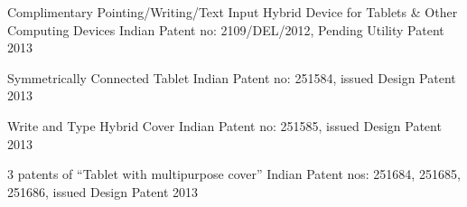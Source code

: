 

\begin{cvhonors}

  \cvhonor
    {Complimentary Pointing/Writing/Text Input Hybrid Device for Tablets \& Other Computing Devices} %
    {Indian Patent no: 2109/DEL/2012, Pending} %
    {Utility Patent} %
    {2013} %


  \cvhonor
    {Symmetrically Connected Tablet} %
    {Indian Patent no: 251584, issued} %
    {Design Patent} %
    {2013} %

  \cvhonor
    {Write and Type Hybrid Cover} %
    {Indian Patent no: 251585, issued} %
    {Design Patent} %
    {2013} %

    
  \cvhonor
    {3 patents of ``Tablet with multipurpose cover''} %
    {Indian Patent nos: 251684, 251685, 251686, issued}   %
    {Design Patent} %
    {2013} %

\end{cvhonors}
